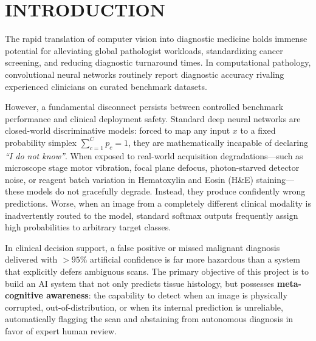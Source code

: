 \documentclass[11pt,a4paper]{article}
\begin{document}
\section{INTRODUCTION}
The rapid translation of computer vision into diagnostic medicine holds immense potential for alleviating global pathologist workloads, standardizing cancer screening, and reducing diagnostic turnaround times. In computational pathology, convolutional neural networks routinely report diagnostic accuracy rivaling experienced clinicians on curated benchmark datasets. 

However, a fundamental disconnect persists between controlled benchmark performance and clinical deployment safety. Standard deep neural networks are closed-world discriminative models: forced to map any input $x$ to a fixed probability simplex $\sum_{c=1}^C p_c = 1$, they are mathematically incapable of declaring \textit{``I do not know''}. When exposed to real-world acquisition degradations---such as microscope stage motor vibration, focal plane defocus, photon-starved detector noise, or reagent batch variation in Hematoxylin and Eosin (H\&E) staining---these models do not gracefully degrade. Instead, they produce confidently wrong predictions. Worse, when an image from a completely different clinical modality is inadvertently routed to the model, standard softmax outputs frequently assign high probabilities to arbitrary target classes.

In clinical decision support, a false positive or missed malignant diagnosis delivered with $>95\%$ artificial confidence is far more hazardous than a system that explicitly defers ambiguous scans. The primary objective of this project is to build an AI system that not only predicts tissue histology, but possesses \textbf{meta-cognitive awareness}: the capability to detect when an image is physically corrupted, out-of-distribution, or when its internal prediction is unreliable, automatically flagging the scan and abstaining from autonomous diagnosis in favor of expert human review.
\end{document}
